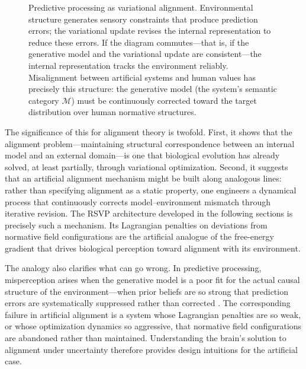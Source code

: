 \documentclass[12pt]{article}
\theoremstyle{definition}
\begin{document}
\begin{figure}[h]
\centering
{}
\caption{Predictive processing as variational alignment. Environmental
structure generates sensory constraints that produce prediction errors; the
variational update revises the internal representation to reduce these errors.
If the diagram commutes---that is, if the generative model and the variational
update are consistent---the internal representation tracks the environment
reliably. Misalignment between artificial systems and human values has
precisely this structure: the generative model (the system's semantic category
$\mathcal{M}$) must be continuously corrected toward the target
distribution over human normative structures.}
\label{fig:predictive}
\end{figure}

The significance of this for alignment theory is twofold. First, it shows that
the alignment problem---maintaining structural correspondence between an
internal model and an external domain---is one that biological evolution has
already solved, at least partially, through variational optimization. Second,
it suggests that an artificial alignment mechanism might be built along
analogous lines: rather than specifying alignment as a static property, one
engineers a dynamical process that continuously corrects model--environment
mismatch through iterative revision. The RSVP architecture developed in the
following sections is precisely such a mechanism. Its Lagrangian penalties on
deviations from normative field configurations are the artificial analogue of
the free-energy gradient that drives biological perception toward alignment with
its environment.

The analogy also clarifies what can go wrong. In predictive processing,
misperception arises when the generative model is a poor fit for the actual
causal structure of the environment---when prior beliefs are so strong that
prediction errors are systematically suppressed rather than corrected
\citep{Hohwy2013}. The corresponding failure in artificial alignment is a system
whose Lagrangian penalties are so weak, or whose optimization dynamics so
aggressive, that normative field configurations are abandoned rather than
maintained. Understanding the brain's solution to alignment under uncertainty
therefore provides design intuitions for the artificial case.
\end{document}
